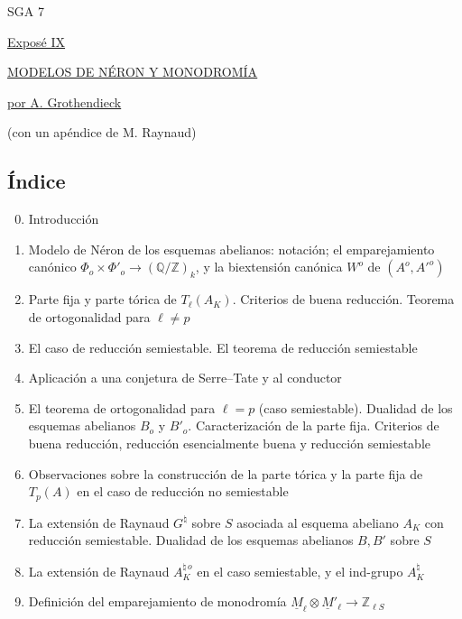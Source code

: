 \begin{center}
SGA 7

\vspace{1em}
\underline{Exposé IX}

\vspace{1em}
\underline{\underline{MODELOS DE NÉRON Y MONODROMÍA}}

\vspace{1em}
\underline{por A. Grothendieck}

(con un apéndice de M. Raynaud)
\end{center}

\subsection*{Índice}

\begin{enumerate}[label=\arabic*.]
\setcounter{enumi}{-1}
\item Introducción
\item Modelo de Néron de los esquemas abelianos: notación; el
  emparejamiento canónico
  $\Phi_o\times\Phi'_o\longrightarrow(\mathbb Q/\mathbb Z)_k$, y la
  biextensión canónica $W^o$ de $(A^o,{A'}^o)$
\item Parte fija y parte tórica de $T_\ell(A_K)$. Criterios de buena
  reducción. Teorema de ortogonalidad para $\ell\ne p$
\item El caso de reducción semiestable. El teorema de reducción
  semiestable
\item Aplicación a una conjetura de Serre--Tate y al conductor
\item El teorema de ortogonalidad para $\ell=p$ (caso semiestable).
  Dualidad de los esquemas abelianos $B_o$ y $B'_o$. Caracterización de
  la parte fija. Criterios de buena reducción, reducción esencialmente
  buena y reducción semiestable
\item Observaciones sobre la construcción de la parte tórica y la parte
  fija de $T_p(A)$ en el caso de reducción no semiestable
\item La extensión de Raynaud $G^\natural$ sobre $S$ asociada al esquema
  abeliano $A_K$ con reducción semiestable. Dualidad de los esquemas
  abelianos $B,B'$ sobre $S$
\item La extensión de Raynaud $A_K^{\natural\,o}$ en el caso semiestable,
  y el ind-grupo $A_K^\natural$
\item Definición del emparejamiento de monodromía
  $\underline M_\ell\otimes\underline M'_\ell\longrightarrow
  \mathbb Z_{\ell S}$

\end{enumerate}
